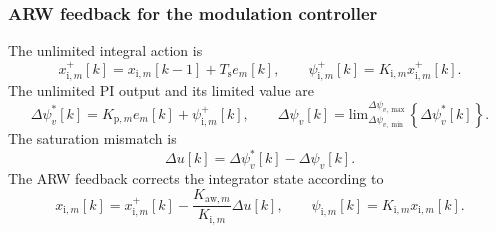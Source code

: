 \begin{frame}
    \frametitle{ARW feedback for the modulation controller}
    The unlimited integral action is
    \begin{equation}
        x_{\mathrm{i},m}^{+}[k]
        =x_{\mathrm{i},m}[k-1]+T_{\mathrm{s}}e_m[k],
        \qquad
        \psi_{\mathrm{i},m}^{+}[k]=K_{\mathrm{i},m}x_{\mathrm{i},m}^{+}[k] .
    \end{equation}
    The unlimited PI output and its limited value are
    \begin{equation}
        \Delta\psi_v^{*}[k]=K_{\mathrm{p},m}e_m[k]+\psi_{\mathrm{i},m}^{+}[k],
        \qquad
        \Delta\psi_v[k]
        =\mathrm{lim}_{\Delta\psi_{v,\min}}^{\Delta\psi_{v,\max}}\left\{\Delta\psi_v^{*}[k]\right\} .
    \end{equation}
    The saturation mismatch is
    \begin{equation}
        \Delta u[k]=\Delta\psi_v^{*}[k]-\Delta\psi_v[k] .
    \end{equation}
    The ARW feedback corrects the integrator state according to
    \begin{equation}
        x_{\mathrm{i},m}[k]
        =x_{\mathrm{i},m}^{+}[k]
        -\frac{K_{\mathrm{aw},m}}{K_{\mathrm{i},m}}\Delta u[k],
        \qquad
        \psi_{\mathrm{i},m}[k]=K_{\mathrm{i},m}x_{\mathrm{i},m}[k] .
    \end{equation}
\end{frame}

